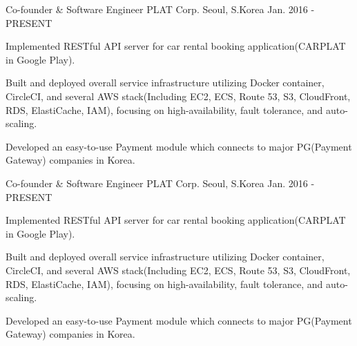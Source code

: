 \begin{cventries}

  \cventry
    {Co-founder \& Software Engineer} %
    {PLAT Corp.} %
    {Seoul, S.Korea} %
    {Jan. 2016 - PRESENT} %
    {
      \begin{cvitems} %
        \item {Implemented RESTful API server for car rental booking application(CARPLAT in Google Play).}
        \item {Built and deployed overall service infrastructure utilizing Docker container, CircleCI, and several AWS stack(Including EC2, ECS, Route 53, S3, CloudFront, RDS, ElastiCache, IAM), focusing on high-availability, fault tolerance, and auto-scaling.}
        \item {Developed an easy-to-use Payment module which connects to major PG(Payment Gateway) companies in Korea.}
      \end{cvitems}
    }


  \cventry
    {Co-founder \& Software Engineer} %
    {PLAT Corp.} %
    {Seoul, S.Korea} %
    {Jan. 2016 - PRESENT} %
    {
      \begin{cvitems} %
        \item {Implemented RESTful API server for car rental booking application(CARPLAT in Google Play).}
        \item {Built and deployed overall service infrastructure utilizing Docker container, CircleCI, and several AWS stack(Including EC2, ECS, Route 53, S3, CloudFront, RDS, ElastiCache, IAM), focusing on high-availability, fault tolerance, and auto-scaling.}
        \item {Developed an easy-to-use Payment module which connects to major PG(Payment Gateway) companies in Korea.}
      \end{cvitems}
    }


 
\end{cventries}
